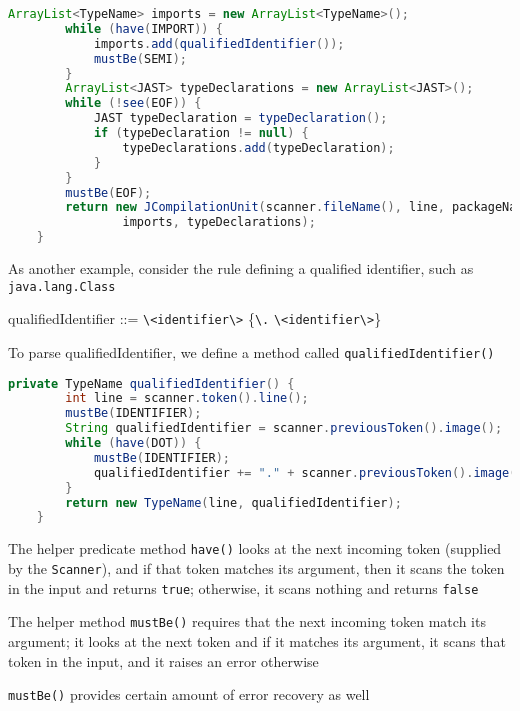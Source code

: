 \documentclass[8pt,a4paper,compress]{beamer}
\newenvironment{spaced}
{
\smallskip
\hspace{.5cm}
\begin{minipage}[c]{\textwidth}
}
{
\end{minipage}
\smallskip
}
\begin{document}
\begin{frame}[fragile]
\pause

\begin{lstlisting}[language=Java]
        ArrayList<TypeName> imports = new ArrayList<TypeName>();
        while (have(IMPORT)) {
            imports.add(qualifiedIdentifier());
            mustBe(SEMI);
        }
        ArrayList<JAST> typeDeclarations = new ArrayList<JAST>();
        while (!see(EOF)) {
            JAST typeDeclaration = typeDeclaration();
            if (typeDeclaration != null) {
                typeDeclarations.add(typeDeclaration);
            }
        }
        mustBe(EOF);
        return new JCompilationUnit(scanner.fileName(), line, packageName,
                imports, typeDeclarations);
    }
\end{lstlisting}
\end{frame}

\begin{frame}[fragile]
\pause

As another example, consider the rule defining a qualified identifier, such as \lstinline{java.lang.Class}

\text{ }
\begin{spaced}
\begin{production}
qualifiedIdentifier ::= \lstinline{\<identifier\>} \{\lstinline{\.} \lstinline{\<identifier\>}\}
\end{production}
\end{spaced}

\pause

To parse qualifiedIdentifier, we define a method called \lstinline{qualifiedIdentifier()}

\begin{lstlisting}[language=Java]
    private TypeName qualifiedIdentifier() {
        int line = scanner.token().line();
        mustBe(IDENTIFIER);
        String qualifiedIdentifier = scanner.previousToken().image();
        while (have(DOT)) {
            mustBe(IDENTIFIER);
            qualifiedIdentifier += "." + scanner.previousToken().image();
        }
        return new TypeName(line, qualifiedIdentifier);
    }
\end{lstlisting}

\pause
\bigskip

The helper predicate method \lstinline{have()} looks at the next incoming token (supplied by the \lstinline{Scanner}), and if that token matches its argument, then it scans the token in the input and returns \lstinline{true}; otherwise, it scans nothing and returns \lstinline{false}

\pause
\bigskip

The helper method \lstinline{mustBe()} requires that the next incoming token match its argument; it looks at the next token and if it matches its argument, it scans that token in the input, and it raises an error otherwise

\pause
\bigskip

\lstinline{mustBe()} provides certain amount of error recovery as well
\end{frame}
\end{document}
